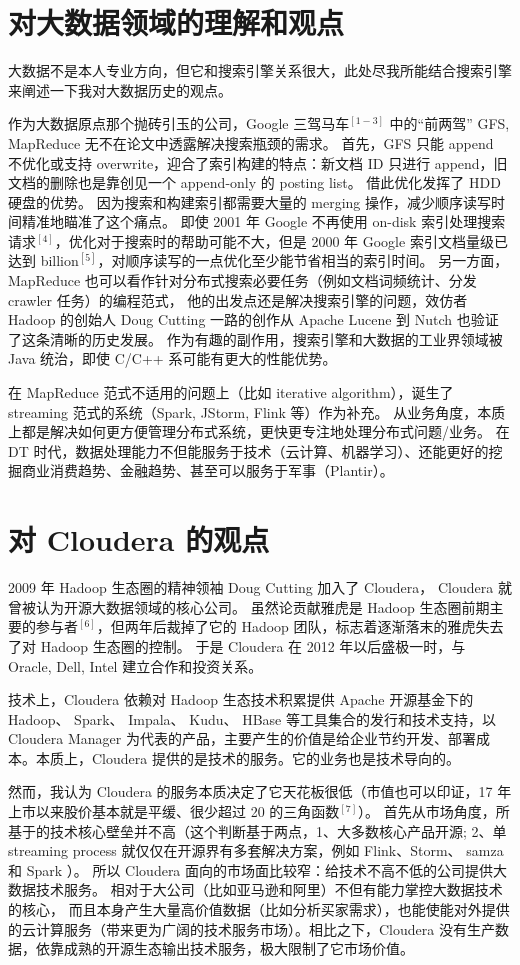 \documentclass[11pt, twoside, a4paper]{article}
\begin{document}
\section{对大数据领域的理解和观点}
大数据不是本人专业方向，但它和搜索引擎关系很大，此处尽我所能结合搜索引擎来阐述一下我对大数据历史的观点。

作为大数据原点那个抛砖引玉的公司，Google 三驾马车$^{[1-3]}$ 中的``前两驾'' GFS, MapReduce 无不在论文中透露解决搜索瓶颈的需求。
首先，GFS 只能 append 不优化或支持 overwrite，迎合了索引构建的特点：新文档 ID 只进行 append，旧文档的删除也是靠创见一个 append-only 的 posting list。
借此优化发挥了 HDD 硬盘的优势。
因为搜索和构建索引都需要大量的 merging 操作，减少顺序读写时间精准地瞄准了这个痛点。
即使 2001 年 Google 不再使用 on-disk 索引处理搜索请求$^{[4]}$，优化对于搜索时的帮助可能不大，但是
2000 年 Google 索引文档量级已达到 billion$^{[5]}$，对顺序读写的一点优化至少能节省相当的索引时间。
另一方面，MapReduce 也可以看作针对分布式搜索必要任务（例如文档词频统计、分发 crawler 任务）的编程范式，
他的出发点还是解决搜索引擎的问题，效仿者 Hadoop 的创始人
Doug Cutting 一路的创作从 Apache Lucene 到 Nutch 也验证了这条清晰的历史发展。
作为有趣的副作用，搜索引擎和大数据的工业界领域被 Java 统治，即使 C/C++ 系可能有更大的性能优势。

在 MapReduce 范式不适用的问题上（比如 iterative algorithm），诞生了 streaming 范式的系统（Spark, JStorm, Flink 等）作为补充。
从业务角度，本质上都是解决如何更方便管理分布式系统，更快更专注地处理分布式问题/业务。
在 DT 时代，数据处理能力不但能服务于技术（云计算、机器学习）、还能更好的挖掘商业消费趋势、金融趋势、甚至可以服务于军事（Plantir）。

\section{对 Cloudera 的观点}
2009 年 Hadoop 生态圈的精神领袖 Doug Cutting 加入了 Cloudera，
Cloudera 就曾被认为开源大数据领域的核心公司。
虽然论贡献雅虎是 Hadoop 生态圈前期主要的参与者$^{[6]}$，但两年后裁掉了它的 Hadoop 团队，标志着逐渐落末的雅虎失去了对 Hadoop 生态圈的控制。
于是 Cloudera 在 2012 年以后盛极一时，与 Oracle, Dell, Intel 建立合作和投资关系。

技术上，Cloudera 依赖对 Hadoop 生态技术积累提供 Apache 开源基金下的 Hadoop、 Spark、 Impala、 Kudu、 HBase 等工具集合的发行和技术支持，以 Cloudera Manager 为代表的产品，主要产生的价值是给企业节约开发、部署成本。本质上，Cloudera 提供的是技术的服务。它的业务也是技术导向的。

然而，我认为 Cloudera 的服务本质决定了它天花板很低（市值也可以印证，17 年上市以来股价基本就是平缓、很少超过 20 的三角函数$^{[7]}$）。
首先从市场角度，所基于的技术核心壁垒并不高（这个判断基于两点，1、大多数核心产品开源; 2、单 streaming process 就仅仅在开源界有多套解决方案，例如 Flink、Storm、 samza 和 Spark ）。
所以 Cloudera 面向的市场面比较窄：给技术不高不低的公司提供大数据技术服务。
相对于大公司（比如亚马逊和阿里）不但有能力掌控大数据技术的核心，
而且本身产生大量高价值数据（比如分析买家需求），也能使能对外提供的云计算服务（带来更为广阔的技术服务市场）。相比之下，Cloudera 没有生产数据，依靠成熟的开源生态输出技术服务，极大限制了它市场价值。
\end{document}
